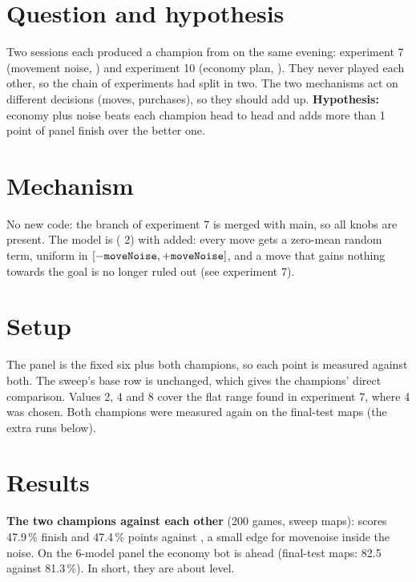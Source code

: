 \documentclass{../polyexp}
\begin{document}

\ExpHeader

\section{Question and hypothesis}
Two sessions each produced a champion from  on the same evening: experiment 7 (movement noise, ) and experiment 10 (economy plan, ). They never played each other, so the chain of experiments had split in two. The two mechanisms act on different decisions (moves, purchases), so they should add up. \textbf{Hypothesis:} economy plus noise beats each champion head to head and adds more than 1 point of panel finish over the better one.

\section{Mechanism}
No new code: the branch of experiment 7 is merged with main, so all knobs are present. The model is  ( 2) with  added: every move gets a zero-mean random term, uniform in $[-\texttt{moveNoise}, +\texttt{moveNoise}]$, and a move that gains nothing towards the goal is no longer ruled out (see experiment 7).

\section{Setup}
The panel is the fixed six plus both champions, so each point is measured against both. The sweep's base row is  unchanged, which gives the champions' direct comparison. Values 2, 4 and 8 cover the flat range found in experiment 7, where 4 was chosen. Both champions were measured again on the final-test maps (the extra runs below).

\section{Results}
\ExpResults

\textbf{The two champions against each other} (200 games, sweep maps):  scores 47.9\,\% finish and 47.4\,\% points against , a small edge for movenoise inside the noise. On the 6-model panel the economy bot is ahead (final-test maps: 82.5 against 81.3\,\%). In short, they are about level.
\end{document}

